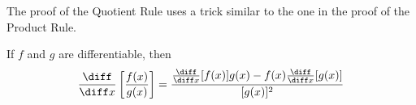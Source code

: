 \begin{frame}
The proof of the Quotient Rule uses a trick similar to the one in the proof of the Product Rule.  
\begin{theorem}
If $f$ and $g$ are differentiable, then
\[
\frac{\diff}{\diff x} \left[ \frac{f(x)}{g(x)}\right] = \frac{\frac{\diff}{\diff x} [f(x)] g(x)- f(x) \frac{\diff}{\diff x}[g(x)]}{[g(x)]^2}
\]
\end{theorem}
\end{frame}
